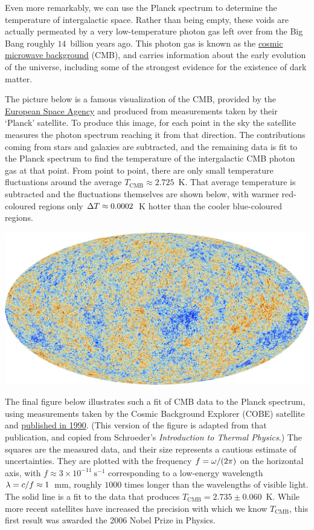 Even more remarkably, we can use the Planck spectrum to determine the temperature of intergalactic space.
Rather than being empty, these voids are actually permeated by a very low-temperature photon gas left over from the Big Bang roughly $14$~billion years ago.
This photon gas is known as the \href{https://en.wikipedia.org/wiki/Cosmic_microwave_background}{cosmic microwave background} (CMB), and carries information about the early evolution of the universe, including some of the strongest evidence for the existence of dark matter.

The picture below is a famous visualization of the CMB, provided by the \href{http://www.esa.int/ESA_Multimedia/Images/2013/03/Planck_CMB}{European Space Agency} and produced from measurements taken by their `Planck' satellite. %
To produce this image, for each point in the sky the satellite measures the photon spectrum reaching it from that direction.
The contributions coming from stars and galaxies are subtracted, and the remaining data is fit to the Planck spectrum to find the temperature of the intergalactic CMB photon gas at that point.
From point to point, there are only small temperature fluctuations around the average $T_{\text{CMB}} \approx 2.725$~K.
That average temperature is subtracted and the fluctuations themselves are shown below, with warmer red-coloured regions only $\Delta T \approx 0.0002$~K hotter than the cooler blue-coloured regions.

\begin{center}\includegraphics[width=\textwidth]{figs/unit08_CMB.pdf}\end{center}

The final figure below illustrates such a fit of CMB data to the Planck spectrum, using measurements taken by the Cosmic Background Explorer (COBE) satellite and \href{https://doi.org/10.1086/185717}{published in 1990}.
(This version of the figure is adapted from that publication, and copied from Schroeder's \textit{Introduction to Thermal Physics}.)
The squares are the measured data, and their size represents a cautious estimate of uncertainties.
They are plotted with the frequency $f = \omega / (2\pi)$ on the horizontal axis, with $f \approx 3\times 10^{-11}~\text{s}^{-1}$ corresponding to a low-energy wavelength $\lambda = c / f \approx 1$~mm, roughly $1000$ times longer than the wavelengths of visible light.
The solid line is a fit to the data that produces $T_{\text{CMB}} = 2.735 \pm 0.060$~K.
While more recent satellites have increased the precision with which we know $T_{\text{CMB}}$, this first result was awarded the 2006 Nobel Prize in Physics.

